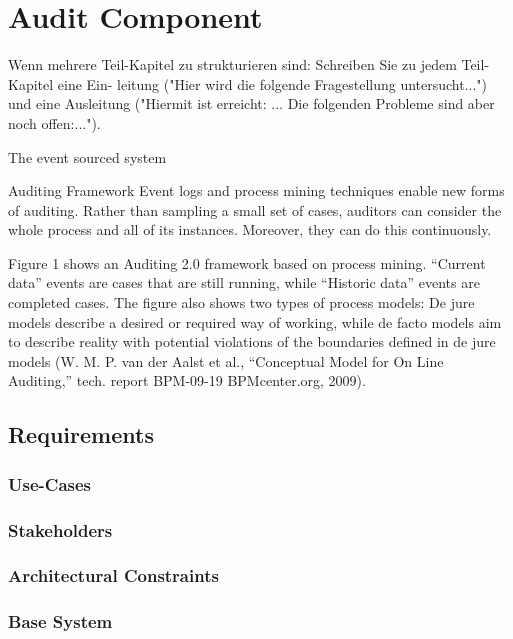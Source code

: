 %
\chapter{Audit Component}

Wenn mehrere Teil-Kapitel zu strukturieren sind: Schreiben Sie zu jedem Teil-Kapitel eine Ein- leitung ("Hier wird die folgende Fragestellung untersucht...") und eine Ausleitung ("Hiermit ist erreicht: ... Die folgenden Probleme sind aber noch offen:...").

The event sourced system \cite{OVEREEM2021110970}

Auditing Framework \cite{5427384}
Event logs and process mining techniques enable new forms of auditing. Rather than sampling a small set of cases, auditors can consider the whole process and all of its instances. Moreover, they can do this continuously.

Figure 1 shows an Auditing 2.0 framework based on process mining. “Current data” events are cases that are still running, while “Historic data” events are completed cases. The figure also shows two types of process models: De jure models describe a desired or required way of working, while de facto models aim to describe reality with potential violations of the boundaries defined in de jure models (W. M. P. van der Aalst et al., “Conceptual Model for On Line Auditing,” tech. report BPM-09-19 BPMcenter.org, 2009).

\section{Requirements}

\subsection{Use-Cases}

\subsection{Stakeholders}

\subsection{Architectural Constraints}

\subsection{Base System}


